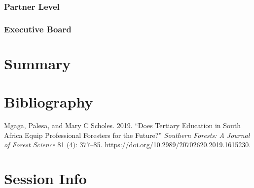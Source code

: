 \documentclass[
  11pt,
]{article}
\newlength{\cslhangindent}
\newenvironment{CSLReferences}[2] %
 {%
  \setlength{\parindent}{0pt}
  \ifodd #1 \everypar{\setlength{\hangindent}{\cslhangindent}}\ignorespaces\fi
  \ifnum #2 > 0
  \setlength{\parskip}{#2\baselineskip}
  \fi
 }%
 {}
\begin{document}
\hypertarget{partner-level}{%
\subsubsection{Partner Level}\label{partner-level}}

\hypertarget{executive-board}{%
\subsubsection{Executive Board}\label{executive-board}}

\clearpage

\hypertarget{summary}{%
\section{Summary}\label{summary}}

\clearpage

\hypertarget{bibliography}{%
\section{Bibliography}\label{bibliography}}

\hypertarget{refs}{}
\begin{CSLReferences}{1}{0}
\leavevmode{}%
Mgaga, Palesa, and Mary C Scholes. 2019. {``Does Tertiary Education in
{South Africa} Equip Professional Foresters for the Future?''}
\emph{Southern Forests: A Journal of Forest Science} 81 (4): 377--85.
\url{https://doi.org/10.2989/20702620.2019.1615230}.

\end{CSLReferences}

\clearpage

\clearpage

\hypertarget{session-info}{%
\section*{Session Info}\label{session-info}}
\end{document}

